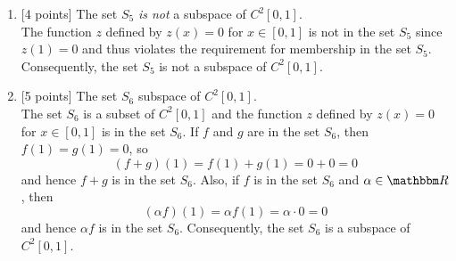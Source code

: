 \begin{solution}
\begin{enumerate}
\\
\item {[4 points]} The set $S_5$ \emph{is not} a subspace of $C^2[0,1]$.\\
The function $z$ defined by $z(x)=0$ for $x\in[0,1]$ is not in the set $S_5$ since $z(1)=0$ and thus violates the requirement for membership in the set $S_5$. Consequently, the set $S_5$ is not a subspace of $C^2[0,1]$.
\\
\item {[5 points]} The set $S_6$ subspace of $C^2[0,1]$.\\
The set $S_6$ is a subset of $C^2[0,1]$ and the function $z$ defined by $z(x)=0$ for $x\in[0,1]$ is in the set $S_6$. If $f$ and $g$ are in the set $S_6$, then $f(1)=g(1)=0$, so
\[
(f+g)(1) = f(1)+g(1) = 0+0 = 0
\]
and hence $f+g$ is in the set $S_6$. Also, if $f$ is in the set $S_6$ and $\alpha\in\R$, then
\[
(\alpha f)(1) = \alpha f(1) = \alpha\cdot 0 = 0
\]
and hence $\alpha f$ is in the set $S_6$. Consequently, the set $S_6$ is a subspace of $C^2[0,1]$.
\end{enumerate}
\end{solution}